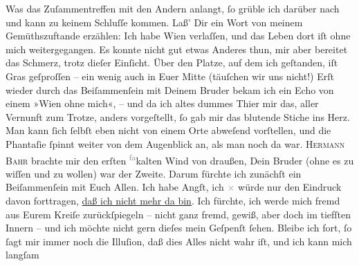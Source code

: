 \pstart
           Was das Zuſammentreffen mit den Andern anlangt,{ }ſo grüble ich darüber nach und kann
               zu keinem Schluſſe kommen. Laß’ Dir ein Wort von meinem Gemüthszuftande erzählen: Ich
               habe Wien verlaſſen, und das Leben dort iſt ohne
               mich weitergegangen. Es konnte nicht gut \strikeout{\textcolor{gray}{e}} etwas Anderes {\pb}thun, mir aber bereitet das
               Schmerz, trotz dieſer Einſicht. Über den Platze, auf dem ich geſtanden, iſt Gras
               geſproſſen – ein wenig auch in Euer Mitte (täuſchen wir uns nicht!) Erſt wieder durch
               das Beiſammenſein mit Deinem Bruder bekam ich ein Echo von einem »Wien
               ohne mich«, – und da ich altes dummes Thier mir das, aller Vernunft zum Trotze,
               anders vorgeſtellt,{ }ſo  gab mir das blutende Stiche ins Herz. Man kann {\pb}ſich{ }ſelbſt eben nicht von einem Orte abweſend
               vorſtellen, und die Phantaſie{ }ſpinnt weiter von dem Augenblick an, als man noch da
               war. \textsc{Hermann Bahr} brachte mir den erſten \substVorne{}\textsuperscript{\textcolor{gray}{fa}}\substDazwischen{}ka\substHinten{}lten Wind von draußen, Dein Bruder (ohne es zu wiſſen und zu wollen) war der Zweite.
               Darum fürchte ich zunächſt ein Beiſammenſein mit Euch Allen. Ich habe Angſt, ich \textcolor{gray}{×} würde nur den Eindruck davon
               forttragen, \uline{daß ich nicht mehr da bin}. Ich fürchte,
               ich werde mich fremd aus Eurem Kreiſe zurückſpiegeln – nicht ganz fremd, gewiß, {\pb}aber doch im tiefſten Innern – und ich möchte nicht
               gern \introOben{}dieſes\introOben{} mein Geſpenſt{ }ſehen. Bleibe ich fort,{ }ſo{ }ſagt
               mir immer noch die Illuſion, daß dies Alles nicht wahr iſt, und ich kann mich langſam
